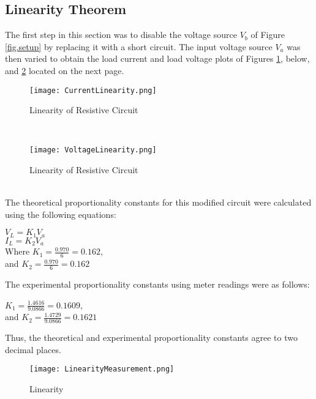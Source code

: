 \documentclass[12pt]{article}
\begin{document}
\subsection{Linearity Theorem}
The first step in this section was to disable the voltage source $ V_{b}$ of Figure \ref{fig.setup} by replacing it with a short circuit. The input voltage source $V_{a}$ was then varied to obtain the load current and load voltage plots of Figures \ref{fig.CurrentLinearity}, below, and \ref{fig.Voltagelinearity} located on the next page.\\
\begin{figure}[htbp]
	\centering
	\texttt{[image: CurrentLinearity.png]}
	\caption{Linearity of Resistive Circuit}
	\label{fig.CurrentLinearity}
\end{figure}\\
\begin{figure}[htbp]
	\centering
	\texttt{[image: VoltageLinearity.png]}
	\caption{Linearity of Resistive Circuit}
	\label{fig.Voltagelinearity}
\end{figure}\\
\pagebreak
\vfill
The theoretical proportionality constants for this modified circuit were calculated using the following equations:
\begin{center}
	$V_{L} = K_{1}V_{a}$\\
	$I_{L} = K_{2}V_{a}$\\[1em]
	Where $K_{1} =\frac{0.970}{6} = 0.162$,\\[0.3em]
	and $K_{2} = \frac{0.970}{6} = 0.162$
\end{center}
The experimental proportionality constants using meter readings were as follows:

\begin{center}
	$K_{1} =\frac{1.4616}{9.0866} = 0.1609$,\\[0.3em]
	and $K_{2} = \frac{1.4729}{9.0866} = 0.1621$
\end{center}
Thus, the theoretical and experimental proportionality constants agree to two decimal places.
\begin{figure}[htbp]
	\centering
	\texttt{[image: LinearityMeasurement.png]}
	\caption{Linearity}
	\label{fig.linMeasure}
\end{figure}
\pagebreak
\end{document}
